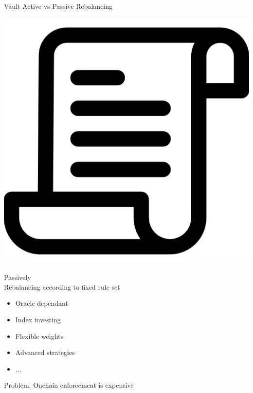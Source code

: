 \documentclass[handout]{beamer}
\begin{document}
\begin{frame}{Vault Active vs Passive Rebalancing}
\begin{minipage}{0.4\textwidth}
\begin{center}
			\includegraphics[scale=0.107]{../assets/images/document.png}
		\end{center}
		\begin{center}
		Passively 	\\ \vspace{1em}
		Rebalancing according to fixed rule set \vspace{0.5em}		
			\begin{scriptsize}
				\begin{itemize}
					\item<1-> Oracle dependant
					\item<2-> Index investing
					\item<3-> Flexible weights 
					\item<4->  Advanced strategies
					\item<4->  ...
				\end{itemize}
			\end{scriptsize}
			\vspace{-1.5em}	
		\end{center}
	\end{minipage}
	
\vspace{2.5em}\center
Problem: Onchain enforcement is expensive
\end{frame}
\end{document}
